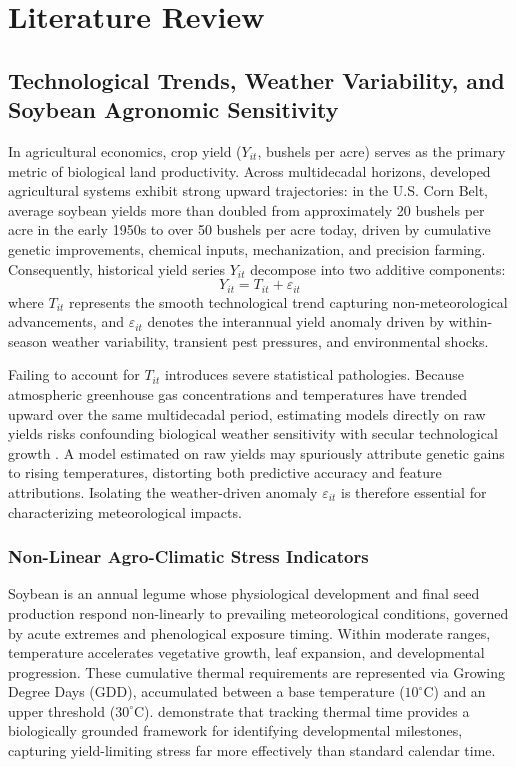 \chapter{Literature Review}
\label{chap:literature_review}

\section{Technological Trends, Weather Variability, and Soybean Agronomic Sensitivity}
\label{sec:lit_yield_trend_weather}

In agricultural economics, crop yield ($Y_{it}$, bushels per acre) serves as the primary metric of biological land productivity. Across multidecadal horizons, developed agricultural systems exhibit strong upward trajectories: in the U.S. Corn Belt, average soybean yields more than doubled from approximately 20 bushels per acre in the early 1950s to over 50 bushels per acre today, driven by cumulative genetic improvements, chemical inputs, mechanization, and precision farming. Consequently, historical yield series $Y_{it}$ decompose into two additive components:
\begin{equation}
    Y_{it} = T_{it} + \varepsilon_{it}
    \label{eq:yield_decomposition}
\end{equation}
where $T_{it}$ represents the smooth technological trend capturing non-meteorological advancements, and $\varepsilon_{it}$ denotes the interannual yield anomaly driven by within-season weather variability, transient pest pressures, and environmental shocks.

Failing to account for $T_{it}$ introduces severe statistical pathologies. Because atmospheric greenhouse gas concentrations and temperatures have trended upward over the same multidecadal period, estimating models directly on raw yields risks confounding biological weather sensitivity with secular technological growth \citep{Schlenker2009}. A model estimated on raw yields may spuriously attribute genetic gains to rising temperatures, distorting both predictive accuracy and feature attributions. Isolating the weather-driven anomaly $\varepsilon_{it}$ is therefore essential for characterizing meteorological impacts.

\subsection{Non-Linear Agro-Climatic Stress Indicators}
Soybean is an annual legume whose physiological development and final seed production respond non-linearly to prevailing meteorological conditions, governed by acute extremes and phenological exposure timing. Within moderate ranges, temperature accelerates vegetative growth, leaf expansion, and developmental progression. These cumulative thermal requirements are represented via Growing Degree Days (GDD), accumulated between a base temperature ($10^\circ\text{C}$) and an upper threshold ($30^\circ\text{C}$). \citet{Hoffman2020} demonstrate that tracking thermal time provides a biologically grounded framework for identifying developmental milestones, capturing yield-limiting stress far more effectively than standard calendar time.

